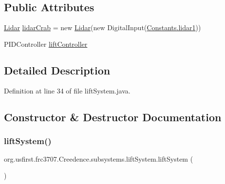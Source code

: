 \subsection*{Public Attributes}
\begin{DoxyCompactItemize}
\item 
\mbox{\hyperlink{classorg_1_1usfirst_1_1frc3707_1_1_creedence_1_1lidar_1_1_lidar}{Lidar}} \mbox{\hyperlink{classorg_1_1usfirst_1_1frc3707_1_1_creedence_1_1subsystems_1_1lift_system_ad9918d856041f6f3e540546f8b828293}{lidar\+Crab}} = new \mbox{\hyperlink{classorg_1_1usfirst_1_1frc3707_1_1_creedence_1_1lidar_1_1_lidar}{Lidar}}(new Digital\+Input(\mbox{\hyperlink{classorg_1_1usfirst_1_1frc3707_1_1_creedence_1_1_p_i_d_ints_1_1_constants_aea549567cdd9492736429691316d0c18}{Constants.\+lidar1}}))
\item 
P\+I\+D\+Controller \mbox{\hyperlink{classorg_1_1usfirst_1_1frc3707_1_1_creedence_1_1subsystems_1_1lift_system_ae588002179642a367c03355d962fb41c}{lift\+Controller}}
\end{DoxyCompactItemize}


\subsection{Detailed Description}


Definition at line 34 of file lift\+System.\+java.



\subsection{Constructor \& Destructor Documentation}
\mbox{\label{classorg_1_1usfirst_1_1frc3707_1_1_creedence_1_1subsystems_1_1lift_system_a8f2867003fb845f46c4e727c27cc664a}} 
\subsubsection{\texorpdfstring{liftSystem()}{liftSystem()}}
{\footnotesize\ttfamily org.\+usfirst.\+frc3707.\+Creedence.\+subsystems.\+lift\+System.\+lift\+System (\begin{DoxyParamCaption}{ }\end{DoxyParamCaption})}



